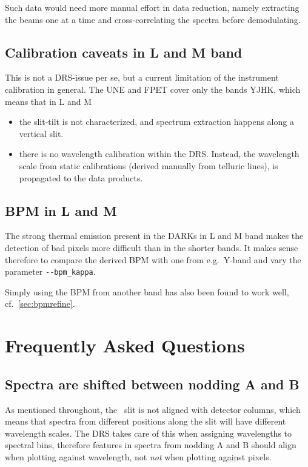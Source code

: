Such data would need more manual effort in data reduction, namely extracting the
beams one at a time and cross-correlating the spectra before demodulating.


\subsection{Calibration caveats in L and M band}

This is not a DRS-issue per se, but a current limitation of the instrument
calibration in general. The UNE and FPET cover only the bands YJHK, which means
that in L and M
\begin{itemize}
    \item the slit-tilt is not characterized, and spectrum extraction happens
    along a vertical slit.
    \item there is no wavelength calibration within the DRS. Instead, the
    wavelength scale from static calibrations (derived manually from telluric
    lines), is propagated to the data products.
\end{itemize}


\subsection{BPM in L and M}

The strong thermal emission present in the DARKs in L and M band makes the
detection of bad pixels more difficult than in the shorter bands. It makes sense
therefore to compare the derived BPM with one from e.g.~Y-band and vary the
parameter \verb!--bpm_kappa!.

Simply using the BPM from another band has also been found to work well,
cf.~\ref*{sec:bpmrefine}.


\section{Frequently Asked Questions}

\subsection{Spectra are shifted between nodding A and B}
\label{faq:tilt}

As mentioned throughout, the \instrument\ slit is not aligned with detector
columns, which means that spectra from different positions along the slit will
have different wavelength scales. The DRS takes care of this when assigning
wavelengths to spectral bins, therefore features in spectra from nodding A and B
should align when plotting against wavelength, not \emph{not} when plotting
against pixels.

